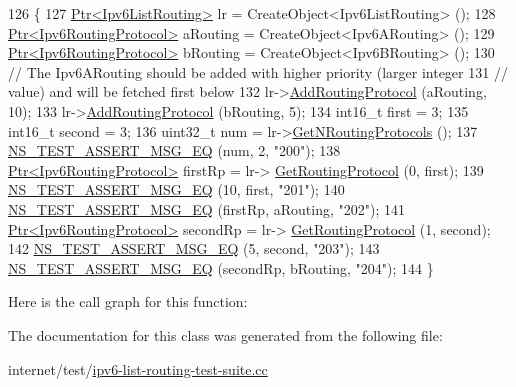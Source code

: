 \begin{DoxyCode}
126 \{
127   \hyperlink{classns3_1_1Ptr}{Ptr<Ipv6ListRouting>} lr = CreateObject<Ipv6ListRouting> ();
128   \hyperlink{classns3_1_1Ptr}{Ptr<Ipv6RoutingProtocol>} aRouting = CreateObject<Ipv6ARouting> ();
129   \hyperlink{classns3_1_1Ptr}{Ptr<Ipv6RoutingProtocol>} bRouting = CreateObject<Ipv6BRouting> ();
130   \textcolor{comment}{// The Ipv6ARouting should be added with higher priority (larger integer}
131   \textcolor{comment}{// value) and will be fetched first below}
132   lr->\hyperlink{classns3_1_1Ipv6ListRouting_af2f9faf061ec907349d7287475fe73bc}{AddRoutingProtocol} (aRouting, 10);
133   lr->\hyperlink{classns3_1_1Ipv6ListRouting_af2f9faf061ec907349d7287475fe73bc}{AddRoutingProtocol} (bRouting, 5);
134   int16\_t first = 3;
135   int16\_t second = 3;
136   uint32\_t num = lr->\hyperlink{classns3_1_1Ipv6ListRouting_a7aa04efd7a6833dddcebe061bcbb0e78}{GetNRoutingProtocols} ();
137   \hyperlink{group__testing_ga2a9d78cffb3db8e867c35fff0b698cf5}{NS\_TEST\_ASSERT\_MSG\_EQ} (num, 2, \textcolor{stringliteral}{"200"});
138   \hyperlink{classns3_1_1Ptr}{Ptr<Ipv6RoutingProtocol>} firstRp = lr->
      \hyperlink{classns3_1_1Ipv6ListRouting_ac57acbccab04b57ffb62a8bd9d40d506}{GetRoutingProtocol} (0, first);
139   \hyperlink{group__testing_ga2a9d78cffb3db8e867c35fff0b698cf5}{NS\_TEST\_ASSERT\_MSG\_EQ} (10, first, \textcolor{stringliteral}{"201"});
140   \hyperlink{group__testing_ga2a9d78cffb3db8e867c35fff0b698cf5}{NS\_TEST\_ASSERT\_MSG\_EQ} (firstRp, aRouting, \textcolor{stringliteral}{"202"});
141   \hyperlink{classns3_1_1Ptr}{Ptr<Ipv6RoutingProtocol>} secondRp = lr->
      \hyperlink{classns3_1_1Ipv6ListRouting_ac57acbccab04b57ffb62a8bd9d40d506}{GetRoutingProtocol} (1, second);
142   \hyperlink{group__testing_ga2a9d78cffb3db8e867c35fff0b698cf5}{NS\_TEST\_ASSERT\_MSG\_EQ} (5, second, \textcolor{stringliteral}{"203"});
143   \hyperlink{group__testing_ga2a9d78cffb3db8e867c35fff0b698cf5}{NS\_TEST\_ASSERT\_MSG\_EQ} (secondRp, bRouting, \textcolor{stringliteral}{"204"});
144 \}
\end{DoxyCode}


Here is the call graph for this function\+:




The documentation for this class was generated from the following file\+:\begin{DoxyCompactItemize}
\item 
internet/test/\hyperlink{ipv6-list-routing-test-suite_8cc}{ipv6-\/list-\/routing-\/test-\/suite.\+cc}\end{DoxyCompactItemize}
